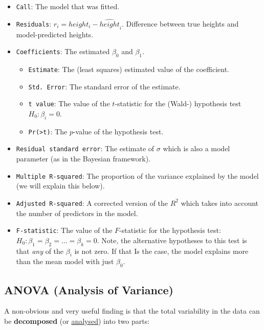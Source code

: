 \documentclass[
]{book}
\providecommand{\tightlist}{%
  \setlength{\itemsep}{0pt}\setlength{\parskip}{0pt}}
\begin{document}
\begin{itemize}
\tightlist
\item
  \texttt{Call}: The model that was fitted.
\item
  \texttt{Residuals}: \(r_i = height_i - \widehat{height}_i\).
  Difference between true heights and model-predicted heights.
\item
  \texttt{Coefficients}: The estimated \(\beta_0\) and \(\beta_1\).

  \begin{itemize}
  \tightlist
  \item
    \texttt{Estimate}: The (least squares) estimated value of the coefficient.
  \item
    \texttt{Std.\ Error}: The standard error of the estimate.
  \item
    \texttt{t\ value}: The value of the \(t\)-statistic for the (Wald-) hypothesis test
    \(H_0: \beta_i = 0\).
  \item
    \texttt{Pr(\textgreater{}\textbar{}t\textbar{})}: The \(p\)-value of the hypothesis test.
  \end{itemize}
\item
  \texttt{Residual\ standard\ error}: The estimate of \(\sigma\)
  which is also a model parameter (as in the Bayesian framework).
\item
  \texttt{Multiple\ R-squared}: The proportion of the variance explained by the
  model (we will explain this below).
\item
  \texttt{Adjusted\ R-squared}: A corrected version of the \(R^2\) which takes into account
  the number of predictors in the model.
\item
  \texttt{F-statistic}: The value of the \(F\)-statistic for the hypothesis test:
  \(H_0: \beta_1 = \beta_2 = \dots = \beta_k = 0\). Note, the alternative
  hypotheses to this test is that \emph{any} of the \(\beta_i\) is not zero. If that Is
  the case, the model explains more than the mean model with just \(\beta_0\).
\end{itemize}

\subsection{ANOVA (Analysis of Variance)}\label{anova-analysis-of-variance}

A non-obvious and very useful finding is that the total variability in the data can be
\textbf{decomposed} (or \href{https://en.wiktionary.org/wiki/analysis}{analysed})
into two parts:
\end{document}
